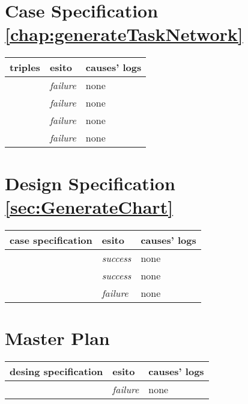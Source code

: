 \section{Case Specification \ref{chap:generateTaskNetwork}}

\begin{table}[h!]
  \begin{center}
    \begin{tabular}{| l | l | p{60mm} |}
    \hline
    \textbf{triples} & \textbf{esito} & \textbf{causes' logs} \\
	\hline    
	\nameref{sec:TNTaskRepresentation} & \emph{failure} & none \\
    \hline
	\nameref{sec:dimensionTaskRepresentation} & \emph{failure} & none \\
    \hline
	\nameref{sec:TNDependencyrepresentation} & \emph{failure} & none \\
    \hline
    \nameref{sec:tn_criticalPathRepresentation} & \emph{failure} & none \\
    \hline
    \end{tabular}
  \end{center}
\end{table}

\section{Design Specification \ref{sec:GenerateChart}}

\begin{table}[h!]
  \begin{center}
    \begin{tabular}{| l | l | p{60mm} |}
    \hline
    \textbf{case specification} & \textbf{esito} & \textbf{causes' logs} \\
	\hline    
	\nameref{chap:generateGantt} & \emph{success} & none \\
    \hline
	\nameref{chap:generateWBS} & \emph{success} & none \\
    \hline
	\nameref{chap:generateTaskNetwork} & \emph{failure} & none \\
    \hline
    \end{tabular}
  \end{center}
\end{table}

\section{Master Plan}

\begin{table}[h!]
  \begin{center}
    \begin{tabular}{| l | l | p{60mm} |}
    \hline
    \textbf{desing specification} & \textbf{esito} & \textbf{causes' logs} \\
	\hline    
	\nameref{chap:generateChartDesingSpecification} & \emph{failure} & none \\
    \hline
    \end{tabular}
  \end{center}
\end{table}